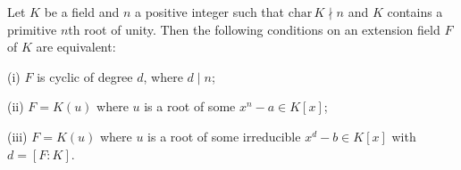 Let $K$ be a field and $n$ a positive integer such that $\mathrm{char}\,K \nmid n$ and $K$ contains a primitive $n$th root of unity. Then the following conditions on an extension field $F$ of $K$ are equivalent:

(i) $F$ is cyclic of degree $d$, where $d \mid n$;

(ii) $F = K(u)$ where $u$ is a root of some $x^n - a \in K[x]$;

(iii) $F = K(u)$ where $u$ is a root of some irreducible $x^d - b \in K[x]$ with $d = [F : K]$.
